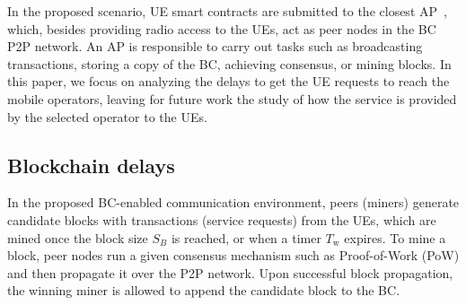 \documentclass[conference]{IEEEtran}
\theoremstyle{definition}
\begin{document}
In the proposed scenario, UE smart contracts are submitted to the closest AP~\cite{ngubo2020wi}, which, besides providing radio access to the UEs, act as peer nodes in the BC P2P network. An AP is responsible to carry out tasks such as broadcasting transactions, storing a copy of the BC, achieving consensus, or mining blocks. In this paper, we focus on analyzing the delays to get the UE requests to reach the mobile operators, leaving for future work the study of how the service is provided by the selected operator to the UEs.

\subsection{Blockchain delays}
In the proposed BC-enabled communication environment, peers (miners) generate candidate blocks with transactions (service requests) from the UEs, which are mined once the block size $S_B$ is reached, or when a timer $T_\text{w}$ expires. To mine a block, peer nodes run a given consensus mechanism such as Proof-of-Work (PoW) and then propagate it over the P2P network. Upon successful block propagation, the winning miner is allowed to append the candidate block to the BC. 
\end{document}
